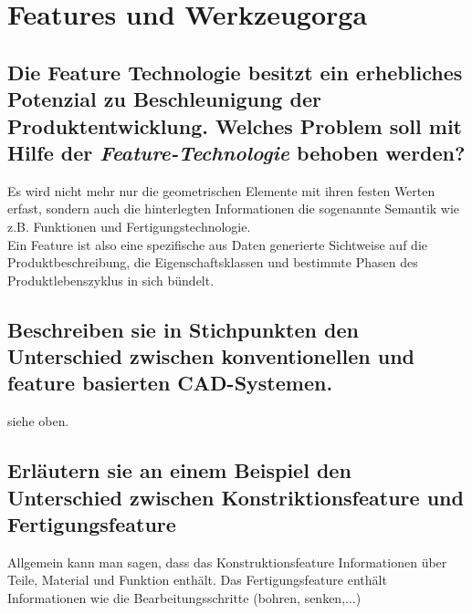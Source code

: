 \newpage


\section{Features und Werkzeugorga}


\subsection*{Die Feature Technologie besitzt ein erhebliches Potenzial zu Beschleunigung der Produktentwicklung. Welches Problem soll mit Hilfe der \textit{Feature-Technologie} behoben werden?}

Es wird nicht mehr nur die geometrischen Elemente mit ihren festen Werten erfast, sondern auch die hinterlegten Informationen die sogenannte \glqq Semantik\grqq {} wie z.B. Funktionen und Fertigungstechnologie. \\

Ein Feature ist also eine spezifische aus Daten generierte Sichtweise auf die Produktbeschreibung, die Eigenschaftsklassen und bestimmte Phasen des Produktlebenszyklus in sich bündelt.


\subsection*{Beschreiben sie in Stichpunkten den Unterschied zwischen \glqq konventionellen\grqq {} und feature basierten CAD-Systemen.}


siehe oben.


\subsection*{Erläutern sie an einem Beispiel den Unterschied zwischen \glqq Konstriktionsfeature\grqq {} und \glqq Fertigungsfeature\grqq}


Allgemein kann man sagen, dass das Konstruktionsfeature Informationen über Teile, Material und Funktion enthält. Das Fertigungsfeature enthält Informationen wie die Bearbeitungsschritte (bohren, senken,...)

